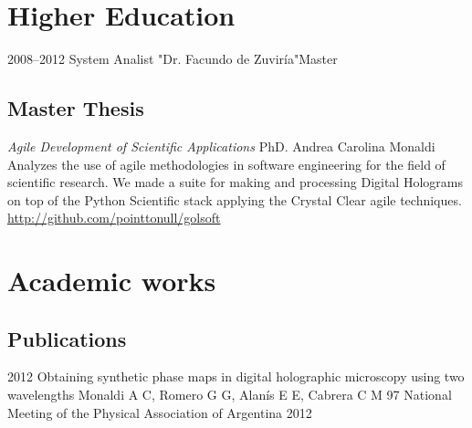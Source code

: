 \documentclass[11pt,a4paper]{moderncv}
\begin{document}
\section{Higher Education}

    \cventry
        {2008--2012}
        {System Analist}
        {"Dr. Facundo de Zuviría"}{Master}{}{}{}

    \subsection{Master Thesis}
            {\emph{Agile Development of Scientific Applications}}
            {PhD. Andrea Carolina Monaldi}
            {
                \small Analyzes the use of agile methodologies in software
                    engineering for the field of scientific research.
                We made a suite for making and processing Digital Holograms on
                    top of the Python Scientific stack applying the Crystal
                    Clear agile techniques.
                    \url{http://github.com/pointtonull/golsoft}
            }


\section{Academic works} %

    \subsection{Publications}                                                    %

        \cventry                                                                 %
            {2012}                                                               %
            {                                                                    %
                Obtaining synthetic phase maps in digital holographic            %
                    microscopy using two wavelengths                             %
            }                                                                    %
            {Monaldi A C, Romero G G, Alanís E E, Cabrera C M}                   %
            {97 National Meeting of the Physical Association of Argentina}       %
            {2012}                                                               %
            {}                                                                   %
\end{document}
